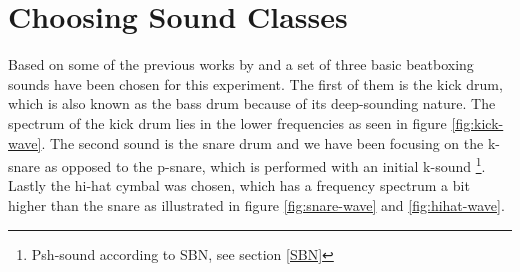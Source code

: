 \section{Choosing Sound Classes}
Based on some of the previous works by \cite{Stowell2010} and \cite{QBBB} a set of three basic beatboxing sounds have been chosen for this experiment. The first of them is the kick drum, which is also known as the bass drum because of its deep-sounding nature. The spectrum of the kick drum lies in the lower frequencies as seen in figure \ref{fig:kick-wave}. The second sound is the snare drum and we have been focusing on the k-snare as opposed to the p-snare, which is performed with an initial k-sound \footnote{Psh-sound according to SBN, see section \ref{SBN}}. Lastly the hi-hat cymbal was chosen, which has a frequency spectrum a bit higher than the snare as illustrated in figure \ref{fig:snare-wave} and \ref{fig:hihat-wave}.

